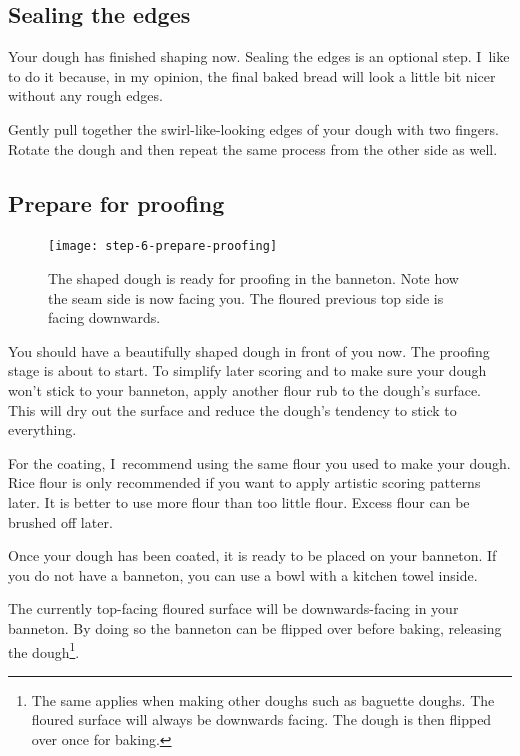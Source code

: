\subsection[Sealing]{Sealing the edges}

Your dough has finished shaping now. Sealing the edges
is an optional step. I~like to do it because, in my opinion,
the final baked bread will look a little bit nicer without
any rough edges.

Gently pull together the swirl-like-looking edges of your dough
with two fingers. Rotate the dough and then repeat the same process
from the other side as well.

\subsection[Proofing preparation]{Prepare for proofing}

\begin{figure}[htb!]
  \centering
  \texttt{[image: step-6-prepare-proofing]}
  \caption[Step 5 of shaping process]{The shaped dough is ready for proofing
      in the banneton. Note how the seam side is now facing you. The floured
      previous top side is facing downwards.}%
  \label{fig:shaping-prepare-proofing}
\end{figure}

You should have a beautifully shaped dough in front of you now.
The proofing stage is about to start. To simplify later
scoring and to make sure your dough won't stick to your banneton,
apply another flour rub to the dough's surface. This
will dry out the surface and reduce the dough's tendency
to stick to everything.

For the coating, I~recommend using the same flour you used
to make your dough. Rice flour is only recommended if you
want to apply artistic scoring patterns later. It is better
to use more flour than too little flour. Excess flour can be
brushed off later.

Once your dough has been coated, it is ready to be placed on your banneton.
If you do not have a banneton, you can use a bowl
with a kitchen towel inside.

The currently top-facing floured surface will be downwards-facing in your banneton.
By doing so the banneton can be flipped
over before baking, releasing the dough\footnote{The same
applies when making other doughs such as baguette doughs. The floured
surface will always be downwards facing. The dough is then flipped over
once for baking.}.

